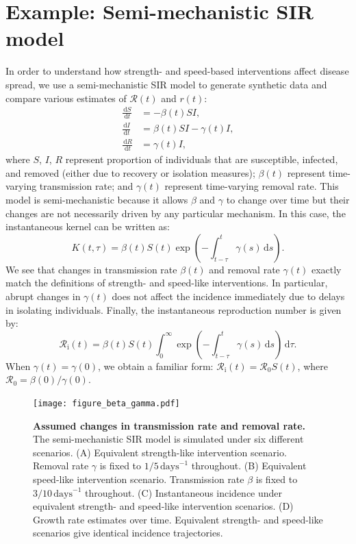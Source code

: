 \documentclass[12pt]{article}
\newcommand{\Rx}[1]{\ensuremath{{\mathcal R}_{#1}}\xspace}
\newcommand{\Ro}{\Rx{0}}
\newcommand{\Ri}{\Rx{\mathrm{i}}}
\newcommand{\RR}{\ensuremath{{\mathcal R}}\xspace}
\newcommand{\dd}[1]{\ensuremath{\, \mathrm{d}#1}}
\newcommand{\dtau}{\dd{\tau}}
\begin{document}
\section{Example: Semi-mechanistic SIR model}

In order to understand how strength- and speed-based interventions affect disease spread, we use a semi-mechanistic SIR model to generate synthetic data and compare various estimates of $\RR(t)$ and $r(t)$:
\begin{align}
\frac{\dd{S}}{\dd{t}} &= - \beta(t)S I,\\
\frac{\dd{I}}{\dd{t}} &= \beta(t)S I - \gamma(t) I,\\
\frac{\dd{R}}{\dd{t}} &= \gamma(t) I,
\end{align}
where $S$, $I$, $R$ represent proportion of individuals that are susceptible, infected, and removed (either due to recovery or isolation measures);
$\beta(t)$ represent time-varying transmission rate; and $\gamma(t)$ represent time-varying removal rate.
This model is semi-mechanistic because it allows $\beta$ and $\gamma$ to change over time but their changes are not necessarily driven by any particular mechanism.
In this case, the instantaneous kernel can be written as:
\begin{equation}
K(t, \tau) = \beta(t) S(t) \exp\left(-\int_{t-\tau}^t \gamma(s) \dd{s} \right).
\end{equation}
We see that changes in transmission rate $\beta(t)$ and removal rate $\gamma(t)$ exactly match the definitions of strength- and speed-like interventions.
In particular, abrupt changes in $\gamma(t)$ does not affect the incidence immediately due to delays in isolating individuals.
Finally, the instantaneous reproduction number is given by:
\begin{equation}
\Ri(t) = \beta(t) S(t) \int_0^\infty \exp\left(-\int_{t-\tau}^t \gamma(s) \dd{s} \right) \dtau.
\end{equation}
When $\gamma(t) = \gamma(0)$, we obtain a familiar form: $\Ri(t) = \Ro S(t)$,
where $\Ro = \beta(0)/\gamma(0)$.

\begin{figure}[!ht]
\texttt{[image: figure\_beta\_gamma.pdf]}
\caption{
\textbf{Assumed changes in transmission rate and removal rate.}
The semi-mechanistic SIR model is simulated under six different scenarios.
(A) Equivalent strength-like intervention scenario.
Removal rate $\gamma$ is fixed to $1/5\,\textrm{days}^{-1}$ throughout.
(B) Equivalent speed-like intervention scenario.
Transmission rate $\beta$ is fixed to $3/10\,\textrm{days}^{-1}$ throughout.
(C) Instantaneous incidence under equivalent strength- and speed-like intervention scenarios.
(D) Growth rate estimates over time.
Equivalent strength- and speed-like scenarios give identical incidence trajectories.
}
\label{fig:assumption}
\end{figure}
\end{document}

